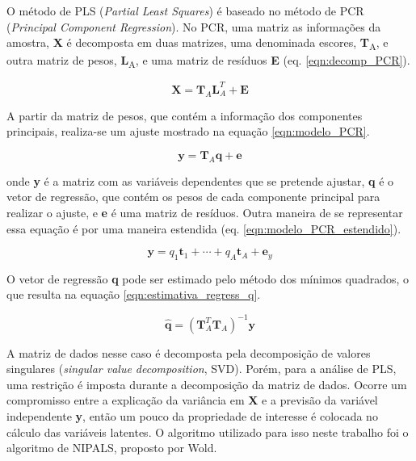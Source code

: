 		O método de PLS (\emph{Partial Least Squares}) é baseado no método de PCR (\emph{Principal Component Regression}). No PCR, uma matriz as informações da amostra, \textbf{X} é decomposta em duas matrizes, uma denominada escores, \textbf{T}\textsubscript{A}, e outra matriz de pesos, \textbf{L}\textsubscript{A}, e uma matriz de resíduos \textbf{E} (eq. \ref{eqn:decomp_PCR}).
		
		\begin{equation}
			\mathbf{X} = \mathbf{T}_A \mathbf{L}_A^T + \mathbf{E}
			\label{eqn:decomp_PCR}
		\end{equation}
		
		A partir da matriz de pesos, que contém a informação dos componentes principais, realiza-se um ajuste mostrado na equação \ref{eqn:modelo_PCR}.
		
		\begin{equation}
			\mathbf{y} = \mathbf{T}_A\mathbf{q} + \mathbf{e}
			\label{eqn:modelo_PCR}
		\end{equation}
		
		\noindent onde \textbf{y} é a matriz com as variáveis dependentes que se pretende ajustar, \textbf{q} é o vetor de regressão, que contém os pesos de cada componente principal para realizar o ajuste, e \textbf{e} é uma matriz de resíduos. Outra maneira de se representar essa equação é por uma maneira estendida (eq. \ref{eqn:modelo_PCR_estendido}).
		
		\begin{equation}
			\mathbf{y} = q_1\mathbf{t}_1 + \cdots + q_A\mathbf{t}_A + \mathbf{e}_y
			\label{eqn:modelo_PCR_estendido}
		\end{equation}
		
		O vetor de regressão \textbf{q} pode ser estimado pelo método dos mínimos quadrados, o que resulta na equação \ref{eqn:estimativa_regress_q}.
		
		\begin{equation}
			\hat{\textbf{q}} = \left(  \mathbf{T}_A^T \mathbf{T}_A  \right)^{-1}\mathbf{y}
			\label{eqn:estimativa_regress_q}
		\end{equation}

		A matriz de dados nesse caso é decomposta pela decomposição de valores singulares (\emph{singular value decomposition}, SVD). Porém, para a análise de PLS, uma restrição é imposta durante a decomposição da matriz de dados. Ocorre um compromisso entre a explicação da variância em \textbf{X} e a previsão da variável independente \textbf{y}, então um pouco da propriedade de interesse é colocada no cálculo das variáveis latentes. O algoritmo utilizado para isso neste trabalho foi o algoritmo de NIPALS, proposto por Wold.
		
